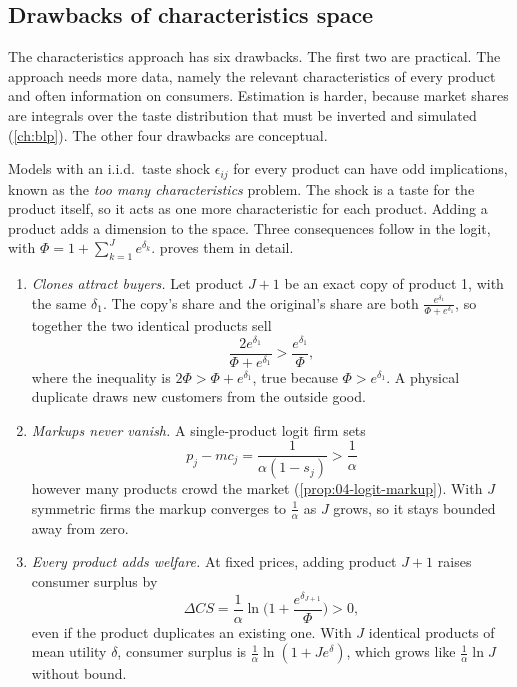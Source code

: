 \subsection{Drawbacks of characteristics space}\label{sec:04-spaces-drawbacks}

The characteristics approach has six drawbacks. The first two are practical. The approach needs more data,
namely the relevant characteristics of every product and often information on consumers. Estimation is harder,
because market shares are integrals over the taste distribution that must be inverted and simulated
(\cref{ch:blp}). The other four drawbacks are conceptual.

Models with an i.i.d.\ taste shock $\epsilon_{ij}$ for every product can have odd implications, known as the
\emph{too many characteristics} problem. The shock is a taste for the product itself, so it acts as one more
characteristic for each product. Adding a product adds a dimension to the space. Three consequences follow in the
logit, with $\Phi = 1 + \sum_{k=1}^{J}e^{\delta_k}$.  proves them in detail.
\begin{enumerate}
  \item \emph{Clones attract buyers.} Let product $J+1$ be an exact copy of product 1, with the same $\delta_1$. The
  copy's share and the original's share are both $\frac{e^{\delta_1}}{\Phi + e^{\delta_1}}$, so together the two
  identical products sell
  \begin{equation*}
  \frac{2e^{\delta_1}}{\Phi + e^{\delta_1}} > \frac{e^{\delta_1}}{\Phi} ,
  \end{equation*}
  where the inequality is $2\Phi > \Phi + e^{\delta_1}$, true because $\Phi > e^{\delta_1}$. A physical duplicate
  draws new customers from the outside good.
  \item \emph{Markups never vanish.} A single-product logit firm sets
  \begin{equation*}
  p_j - mc_j = \frac{1}{\alpha(1 - s_j)} > \frac{1}{\alpha}
  \end{equation*}
  however many products crowd the market (\cref{prop:04-logit-markup}). With $J$ symmetric firms the markup
  converges to $\frac{1}{\alpha}$ as $J$ grows, so it stays bounded away from zero.
  \item \emph{Every product adds welfare.} At fixed prices, adding product $J+1$ raises consumer surplus by
  \begin{equation*}
  \Delta CS = \frac{1}{\alpha}\ln\Big(1 + \frac{e^{\delta_{J+1}}}{\Phi}\Big) > 0 ,
  \end{equation*}
  even if the product duplicates an existing one. With $J$ identical products of mean utility $\delta$, consumer
  surplus is $\frac{1}{\alpha}\ln(1 + Je^{\delta})$, which grows like $\frac{1}{\alpha}\ln J$ without bound.
\end{enumerate}
